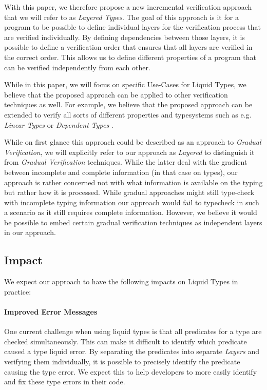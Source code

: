 \documentclass[acmsmall, review, screen]{acmart}
\begin{document}
With this paper, we therefore propose a new incremental verification approach that we will refer to as \textit{Layered Types}. The goal of this approach is it for a program to be possible to define individual layers for the verification process that are verified individually. By defining dependencies between those layers, it is possible to define a verification order that ensures that all layers are verified in the correct order. This allows us to define different properties of a program that can be verified independently from each other.

While in this paper, we will focus on specific Use-Cases for Liquid Types, we believe that the proposed approach can be applied to other verification techniques as well. For example, we believe that the proposed approach can be extended to verify all sorts of different properties and typesystems such as e.g. \textit{Linear Types} \cite{linear_types} or \textit{Dependent Types} \cite{dependent_types}.

While on first glance this approach could be described as an approach to \textit{Gradual Verification}, we will explicitly refer to our approach as \textit{Layered} to distinguish it from \textit{Gradual Verification} techniques. While the latter deal with the gradient between incomplete and complete information (in that case on types), our approach is rather concerned not with what information is available on the typing but rather how it is processed. While gradual approaches might still type-check with incomplete typing information our approach would fail to typecheck in such a scenario as it still requires complete information. However, we believe it would be possible to embed certain gradual verification techniques as independent layers in our approach.

\subsection{Impact}

We expect our approach to have the following impacts on Liquid Types in practice:

\paragraph{Improved Error Messages}

One current challenge when using liquid types is that all predicates for a type are checked simultaneously. This can make it difficult to identify which predicate caused a type liquid error. By separating the predicates into separate \textit{Layers} and verifying them individually, it is possible to precisely identify the predicate causing the type error. We expect this to help developers to more easily identify and fix these type errors in their code.
\end{document}
